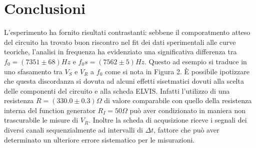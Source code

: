 \documentclass{article}
\begin{document}
\section{Conclusioni}
L'esperimento ha fornito risultati contrastanti: sebbene il comporatmento atteso del circuito ha trovato buon riscontro nel fit dei dati sperimentali alle curve teoriche, l'analisi in frequenza ha evidenziato una significativa differenza
tra $f_0=(7351\pm68)Hz$ e  $f_0s=(7562\pm5)Hz$. Questo ad esempio si traduce in uno sfasamento tra $V_S$ e $V_R$ a $f_0$ come si nota in Figura 2. 
\`E possibile ipotizzare che questa discordanza si dovuta ad alcuni effetti sisetmatici dovuti alla scelta delle componenti del circuito e alla scheda ELVIS. Infatti l'utilizzo di una resistenza $R=(330.0\pm0.3)\Omega$ di valore comparabile con quello della resistenza interna del function generator $R_I=50\Omega$
può aver condizionato in maniera non trascurabile le misure di $V_R$. Inoltre la scheda di acqusizione riceve i segnali dei diversi canali sequenzialmente ad intervalli di $\Delta t$, fattore che può aver determinato un ulteriore errore sistematico per le misurazioni.
\end{document}
